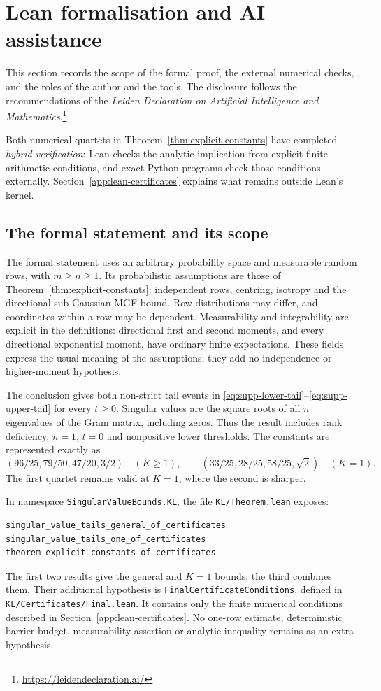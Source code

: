 \documentclass[11pt,a4paper]{article}
\numberwithin{equation}{section}
\begin{document}
\section{Lean formalisation and AI assistance}
\label{app:lean}

This section records the scope of the formal proof, the external numerical
checks, and the roles of the author and the tools. The disclosure follows the
recommendations of the \emph{Leiden Declaration on Artificial Intelligence and
Mathematics}.\footnote{\url{https://leidendeclaration.ai/}}

Both numerical quartets in Theorem~\ref{thm:explicit-constants} have completed
\emph{hybrid verification}: Lean checks the analytic implication from explicit
finite arithmetic conditions, and exact Python programs check those conditions
externally. Section~\ref{app:lean-certificates} explains what remains outside
Lean's kernel.

\subsection{The formal statement and its scope}
\label{app:lean-statement}

The formal statement uses an arbitrary probability space and measurable random
rows, with $m\ge n\ge1$. Its probabilistic assumptions are those of
Theorem~\ref{thm:explicit-constants}: independent rows, centring, isotropy and
the directional sub-Gaussian MGF bound. Row distributions may differ, and
coordinates within a row may be dependent. Measurability and integrability
are explicit in the definitions: directional first and second moments, and
every directional exponential moment, have ordinary finite expectations.
These fields express the usual meaning of the assumptions; they add no
independence or higher-moment hypothesis.

The conclusion gives both non-strict tail events in
\eqref{eq:supp-lower-tail}--\eqref{eq:supp-upper-tail} for every $t\ge0$.
Singular values are the square roots of all $n$ eigenvalues of the Gram matrix,
including zeros. Thus the result includes rank deficiency, $n=1$, $t=0$ and
nonpositive lower thresholds. The constants are represented exactly as
\[
 (96/25,79/50,47/20,3/2)\quad(K\ge1),\qquad
 (33/25,28/25,58/25,\sqrt2)\quad(K=1).
\]
The first quartet remains valid at $K=1$, where the second is sharper.

In namespace \texttt{SingularValueBounds.KL}, the file
\texttt{KL/Theorem.lean} exposes:
\begin{verbatim}
singular_value_tails_general_of_certificates
singular_value_tails_one_of_certificates
theorem_explicit_constants_of_certificates
\end{verbatim}
The first two results give the general and $K=1$ bounds; the third combines
them. Their additional hypothesis is \texttt{FinalCertificateConditions},
defined in \texttt{KL/Certificates/Final.lean}. It contains only the finite
numerical conditions described in Section~\ref{app:lean-certificates}.
No one-row estimate, deterministic barrier budget, measurability assertion
or analytic inequality remains as an extra hypothesis.
\end{document}
